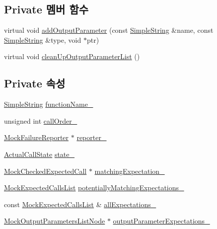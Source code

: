 \subsection*{Private 멤버 함수}
\begin{DoxyCompactItemize}
\item 
virtual void \hyperlink{class_mock_checked_actual_call_a3e455a0520e2de1fdeec6cce0fe0ecf9}{add\+Output\+Parameter} (const \hyperlink{class_simple_string}{Simple\+String} \&name, const \hyperlink{class_simple_string}{Simple\+String} \&type, void $\ast$ptr)
\item 
virtual void \hyperlink{class_mock_checked_actual_call_a9e99bfc839f61bce92e4bffa4377dcf1}{clean\+Up\+Output\+Parameter\+List} ()
\end{DoxyCompactItemize}
\subsection*{Private 속성}
\begin{DoxyCompactItemize}
\item 
\hyperlink{class_simple_string}{Simple\+String} \hyperlink{class_mock_checked_actual_call_ac33176f3607073fb4b51a445d8912ba7}{function\+Name\+\_\+}
\item 
unsigned int \hyperlink{class_mock_checked_actual_call_a9c2547cfdee90cd355837413e7cf0760}{call\+Order\+\_\+}
\item 
\hyperlink{class_mock_failure_reporter}{Mock\+Failure\+Reporter} $\ast$ \hyperlink{class_mock_checked_actual_call_a46f5703a1c6c55a7969c9f69cdbb5557}{reporter\+\_\+}
\item 
\hyperlink{class_mock_checked_actual_call_a51287301ad26cf1a31a1e33a4fd76e8c}{Actual\+Call\+State} \hyperlink{class_mock_checked_actual_call_a9b5ca51a5cc79a6f6c83f0f327432078}{state\+\_\+}
\item 
\hyperlink{class_mock_checked_expected_call}{Mock\+Checked\+Expected\+Call} $\ast$ \hyperlink{class_mock_checked_actual_call_aca733859eb143b7a7bf611a39d94d6f6}{matching\+Expectation\+\_\+}
\item 
\hyperlink{class_mock_expected_calls_list}{Mock\+Expected\+Calls\+List} \hyperlink{class_mock_checked_actual_call_a4fc6bec7509ed6eb28096956758c030a}{potentially\+Matching\+Expectations\+\_\+}
\item 
const \hyperlink{class_mock_expected_calls_list}{Mock\+Expected\+Calls\+List} \& \hyperlink{class_mock_checked_actual_call_aed217603c4a32c8f55a3087ac4a64a78}{all\+Expectations\+\_\+}
\item 
\hyperlink{class_mock_checked_actual_call_1_1_mock_output_parameters_list_node}{Mock\+Output\+Parameters\+List\+Node} $\ast$ \hyperlink{class_mock_checked_actual_call_a02acb8bd949c46aac38abc754e4dfc36}{output\+Parameter\+Expectations\+\_\+}
\end{DoxyCompactItemize}



